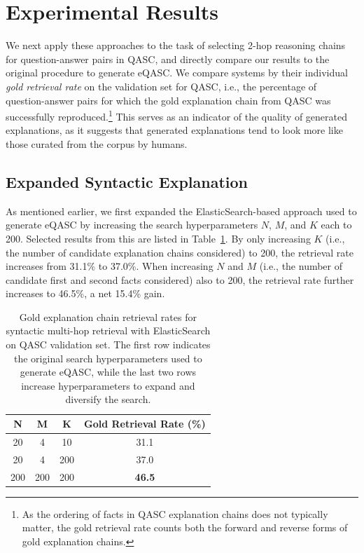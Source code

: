 \documentclass[letterpaper]{article} %
\begin{document}
\section{Experimental Results}
We next apply these approaches to the task of selecting 2-hop reasoning chains for question-answer pairs in QASC, and directly compare our results to the original procedure to generate eQASC. We compare systems by their individual \textit{gold retrieval rate} on the validation set for QASC, i.e., the percentage of question-answer pairs for which the gold explanation chain from QASC was successfully reproduced.\footnote{As the ordering of facts in QASC explanation chains does not typically matter, the gold retrieval rate counts both the forward and reverse forms of gold explanation chains.} This serves as an indicator of the quality of generated explanations, as it suggests that generated explanations tend to look more like those curated from the corpus by humans.

\subsection{Expanded Syntactic Explanation}
As mentioned earlier, we first expanded the ElasticSearch-based approach used to generate eQASC by increasing the search hyperparameters $N$, $M$, and $K$ each to 200. Selected results from this are listed in Table~\ref{tab:expand syntactic}. By only increasing $K$ (i.e., the number of candidate explanation chains considered) to 200, the retrieval rate increases from 31.1\% to 37.0\%. When increasing $N$ and $M$ (i.e., the number of candidate first and second facts considered) also to 200, the retrieval rate further increases to 46.5\%, a net 15.4\% gain.

\begin{table}
    \centering
    \footnotesize
    \begin{tabular}{ccc|c}
        \toprule
        \textbf{N} & \textbf{M} & \textbf{K} & \textbf{Gold Retrieval Rate (\%)} \\\midrule
        20 & 4 & 10 & 31.1 \\
        20 & 4 & 200 & 37.0 \\
        200 & 200 & 200 & \textbf{46.5} \\
        \bottomrule
    \end{tabular}
    \normalsize
    \caption{Gold explanation chain retrieval rates for syntactic multi-hop retrieval with ElasticSearch on QASC validation set. The first row indicates the original search hyperparameters used to generate eQASC, while the last two rows increase hyperparameters to expand and diversify the search.}
    \label{tab:expand syntactic}
\end{table}
\end{document}
